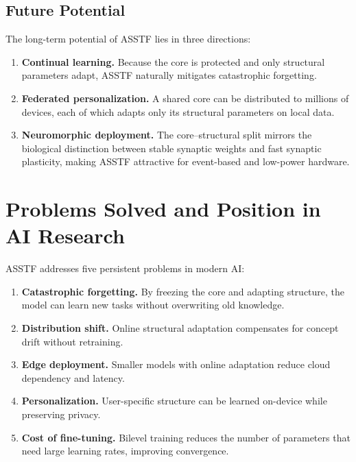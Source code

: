 \documentclass[11pt,a4paper]{article}
\theoremstyle{definition}
\begin{document}
\subsection{Future Potential}
\label{subsec:potential}

The long-term potential of ASSTF lies in three directions:
\begin{enumerate}
    \item \textbf{Continual learning.} Because the core is protected and only structural parameters adapt, ASSTF naturally mitigates catastrophic forgetting.
    \item \textbf{Federated personalization.} A shared core can be distributed to millions of devices, each of which adapts only its structural parameters on local data.
    \item \textbf{Neuromorphic deployment.} The core--structural split mirrors the biological distinction between stable synaptic weights and fast synaptic plasticity, making ASSTF attractive for event-based and low-power hardware.
\end{enumerate}

\section{Problems Solved and Position in AI Research}
\label{sec:innovation}

ASSTF addresses five persistent problems in modern AI:

\begin{enumerate}
    \item \textbf{Catastrophic forgetting.} By freezing the core and adapting structure, the model can learn new tasks without overwriting old knowledge.
    \item \textbf{Distribution shift.} Online structural adaptation compensates for concept drift without retraining.
    \item \textbf{Edge deployment.} Smaller models with online adaptation reduce cloud dependency and latency.
    \item \textbf{Personalization.} User-specific structure can be learned on-device while preserving privacy.
    \item \textbf{Cost of fine-tuning.} Bilevel training reduces the number of parameters that need large learning rates, improving convergence.
\end{enumerate}
\end{document}
